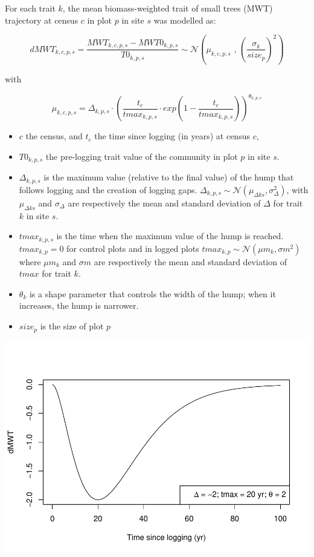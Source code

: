 \documentclass[]{elsarticle} %
\makeatletter
\def\maxwidth{\ifdim\Gin@nat@width>\linewidth\linewidth
\else\Gin@nat@width\fi}
\let\Oldincludegraphics\includegraphics
\renewcommand{\includegraphics}[1]{\Oldincludegraphics[width=\maxwidth]{#1}}
\makeatother
\begin{document}
For each trait \(k\), the mean biomass-weighted trait of small trees
(MWT) trajectory at census \(c\) in plot \(p\) in site \(s\) was
modelled as:

\begin{equation}  
dMWT_{k,c,p,s} = \frac{MWT_{k,c,p,s} - MWT0_{k,p,s}}{T0_{k,p,s}} \sim \mathcal{N}\left( \mu_{k,c,p,s}\text{ , } \left(\frac{\sigma_k}{size_p}\right)^2\right)
\end{equation}

with

\begin{equation}  
\mu_{k,c,p,s} = \Delta_{k,p,s} \cdot \left( \frac{t_c}{tmax_{k,p,s}} \cdot exp\left(1-\frac{t_c}{tmax_{k,p,s}}\right) \right)^{\theta_{k,p,s}}
\end{equation}

\begin{itemize}
\item
  \(c\) the census, and \(t_c\) the time since logging (in years) at
  census \(c\),
\item
  \(T0_{k,p,s}\) the pre-logging trait value of the community in plot
  \(p\) in site \(s\).
\item
  \(\Delta_{k,p,s}\) is the maximum value (relative to the final value)
  of the hump that follows logging and the creation of logging gaps.
  \(\Delta_{k,p,s} \sim \mathcal{N} (\mu_{\Delta ks}, \sigma_{\Delta}^2)\),
  with \(\mu_{\Delta ks}\) and \(\sigma_{\Delta}\) are respectively the
  mean and standard deviation of \(\Delta\) for trait \(k\) in site
  \(s\).
\item
  \(tmax_{k,p,s}\) is the time when the maximum value of the hump is
  reached. \(tmax_{k,p} = 0\) for control plots and in logged plots
  \(tmax_{k,p} \sim \mathcal{N} (\mu m_{ k}, \sigma m^2)\) where
  \(\mu m_{k}\) and \(\sigma m\) are respectively the mean and standard
  deviation of \(tmax\) for trait \(k\).
\item
  \(\theta_k\) is a shape parameter that controls the width of the hump;
  when it increases, the hump is narrower.
\item
  \(size_p\) is the size of plot \(p\)
\end{itemize}

\includegraphics{rticle_tmfo_functional_files/figure-latex/unnamed-chunk-1-1.pdf}
\end{document}
